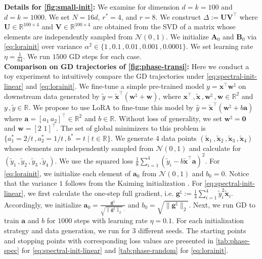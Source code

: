 \noindent
{\bf Details for \cref{fig:small-init}:} We examine for dimension $d=k=100$ and $d=k=1000$. We set $N=16d$, $r^*=4$, and $r=8$. We construct $\Delta:=\bm U \bm V^{\!\top}$ where $\bm U\in\mathbb{R}^{100\times 4}$ and $\bm V\in\mathbb{R}^{100\times 4}$ are obtained from the SVD of a matrix whose elements are independently sampled from $\mathcal{N}(0\,,1)$. We initialize $\bm A_0$ and $\bm B_0$ via \eqref{eq:lorainit} over variance $\alpha^2\in\{1\,,0.1\,,0.01\,,0.001\,,0.0001\}$. We set learning rate $\eta=\frac{1}{64}$. We run $1500$ GD steps for each case.\\

\noindent
{\bf Comparison on GD trajectories of \cref{fig:phase-transi}:}
Here we conduct a toy experiment to intuitively compare the GD trajectories under \eqref{eq:spectral-init-linear} and \eqref{eq:lorainit}. We fine-tune a simple pre-trained model $y=\bm x^{\!\top}\bm w^\natural$ on downstream data generated by $\widetilde{y}=\widetilde{\bm x}^{\!\top}(\bm w^\natural+\bm w)$, where $\bm x^{\!\top}\,,\widetilde{\bm x}\,,\bm w^\natural\,,\bm w\in\mathbb{R}^2$ and $y\,,\widetilde{y}\in\mathbb{R}$. We propose to use LoRA to fine-tune this model by $\widehat{y} = \widetilde{\bm x}^{\!\top}(\bm w^\natural+b \bm a)$ where $\bm a = [a_1\,a_2]^{\!\top}\in\mathbb{R}^2$ and $b\in\mathbb{R}$. Without loss of generality, we set $\bm w^\natural=\bm 0$ and $\bm w = [2\,\,1]^{\!\top}$. The set of global minimizers to this problem is $\{a_1^*=2/t\,,a_2^*=1/t\,,b^*=t\mid t \in \mathbb{R}\}$. We generate 4 data points $(\widetilde{\bm x}_1\,,\widetilde{\bm x}_2\,,\widetilde{\bm x}_3\,,\widetilde{\bm x}_4)$ whose elements are independently sampled from $\mathcal{N}(0\,,1)$ and calculate for $(\widetilde{y}_1\,,\widetilde{y}_2\,,\widetilde{y}_3\,,\widetilde{y}_4)$. We use the squared loss $\frac{1}{8}\sum_{i=1}^4 (\widetilde{y}_i-b\widetilde{\bm x}^{\!\top} \bm a)^2$. For \eqref{eq:lorainit}, we initialize each element of $\bm a_0$ from $\mathcal{N}(0\,,1)$ and $b_0=0$. Notice that the variance $1$ follows from the Kaiming initialization \citep{he2015delving}. For \eqref{eq:spectral-init-linear}, we first calculate the one-step full gradient, i.e. $\bm g^\natural := \frac{1}{4}\sum_{i=1}^4 \widetilde{y}_i^2 \widetilde{\bm x}_i$.
Accordingly, we initialize $\bm a_0 = \frac{\bm g^\natural}{\sqrt{\|\bm g^\natural\|_2}\,.}$ and $b_0 = \sqrt{\|\bm g^\natural\|_2}$. Next, we run GD to train $\bm a$ and $b$ for $1000$ steps with learning rate $\eta=0.1$. For each initialization strategy and data generation, we run for 3 different seeds. The starting points and stopping points with corresponding loss values are presented in \cref{tab:phase-spec} for \eqref{eq:spectral-init-linear} and \cref{tab:phase-random} for \eqref{eq:lorainit}.
